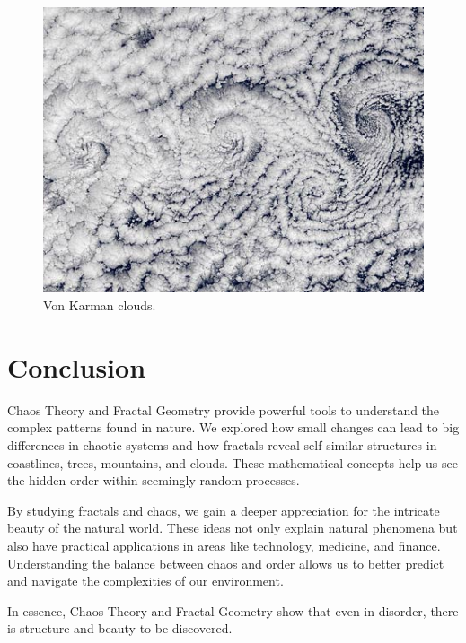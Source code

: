 \documentclass[12pt]{article}
\begin{document}
\begin{figure}[H]
\centering
\includegraphics[width=\textwidth]{assets/vonkarman-clouds.jpg}
\caption{Von Karman clouds.}
\label{fig:vonkarman-clouds}
\end{figure}

\newpage

\section{Conclusion}
Chaos Theory and Fractal Geometry provide powerful tools to understand the complex patterns found in nature. We explored how small changes can lead to big differences in chaotic systems and how fractals reveal self-similar structures in coastlines, trees, mountains, and clouds. These mathematical concepts help us see the hidden order within seemingly random processes.

By studying fractals and chaos, we gain a deeper appreciation for the intricate beauty of the natural world. These ideas not only explain natural phenomena but also have practical applications in areas like technology, medicine, and finance. Understanding the balance between chaos and order allows us to better predict and navigate the complexities of our environment.

In essence, Chaos Theory and Fractal Geometry show that even in disorder, there is structure and beauty to be discovered.

\newpage

\nocite{*} 
 

\end{document}
